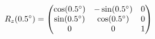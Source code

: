 \documentclass[preview]{standalone}
\begin{document}
\begin{align*}
\special{dvisvgm:raw <g id='unique000'>}R_z(0.5^\circ) = \begin{pmatrix} \cos(0.5^\circ) & -\sin(0.5^\circ) & 0 \\ \sin(0.5^\circ) & \cos(0.5^\circ) & 0 \\ 0 & 0 & 1 \end{pmatrix}\special{dvisvgm:raw </g>}
\end{align*}
\end{document}

